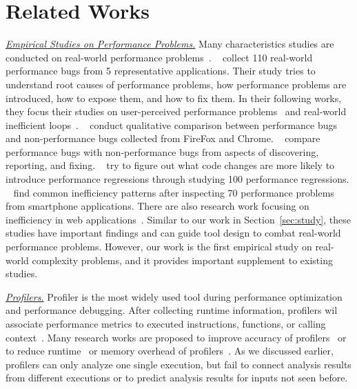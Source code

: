 \section{Related Works}
\label{sec:related}

{\underline{\textit{Empirical Studies on Performance Problems.}}
Many characteristics studies are conducted on real-world performance 
problems~\cite{PerfBug,SongOOPSLA2014,ldoctor,Zaman2012MSR,Nistor2013MSR,HuangRegression,SmartphoneStudy,junwen-1, junwen-2}. 
~\citet{PerfBug} collect 110 real-world performance bugs from 5 representative applications.
Their study tries to understand root causes of performance problems,
how performance problems are introduced, how to expose them, and how to fix them.
In their following works, they focus their studies on 
user-perceived performance problems~\cite{SongOOPSLA2014} 
and real-world inefficient loops~\cite{ldoctor}. 
~\citet{Zaman2012MSR} conduct qualitative comparison between performance bugs 
and non-performance bugs collected from FireFox and Chrome. 
~\citet{Nistor2013MSR} compare performance bugs with non-performance bugs 
from aspects of discovering, reporting, and fixing. 
~\citet{HuangRegression} try to figure out what code changes are more likely to introduce performance regressions through 
studying 100 performance regressions. 
~\citet{SmartphoneStudy} find common inefficiency patterns after 
inspecting 70 performance problems from smartphone applications. 
There are also research work focusing on inefficiency in web applications~\cite{junwen-1, junwen-2}. 
Similar to our work in Section~\ref{sec:study}, 
these studies have important findings and can guide tool design to combat 
real-world performance problems. 
However, our work is the first empirical study on real-world complexity problems, 
and it provides important supplement to existing studies. 

{\underline{\textit{Profilers.}}
Profiler is the most widely used tool during performance optimization and performance debugging. 
After collecting runtime information, 
profilers wil associate performance metrics to executed instructions, 
functions, or calling context~\cite{oprofile,gprof, CCT}.
Many research works are proposed to improve 
accuracy of profilers~\cite{4Profilers, LagHunter, AppInsight} or 
to reduce runtime~\cite{AdaptiveBurst} or memory overhead of profilers~\cite{HotCallingContext}. 
As we discussed earlier, profilers can only analyze one single execution, 
but fail to connect analysis results from different executions 
or to predict analysis results for inputs not seen before.  


}}
